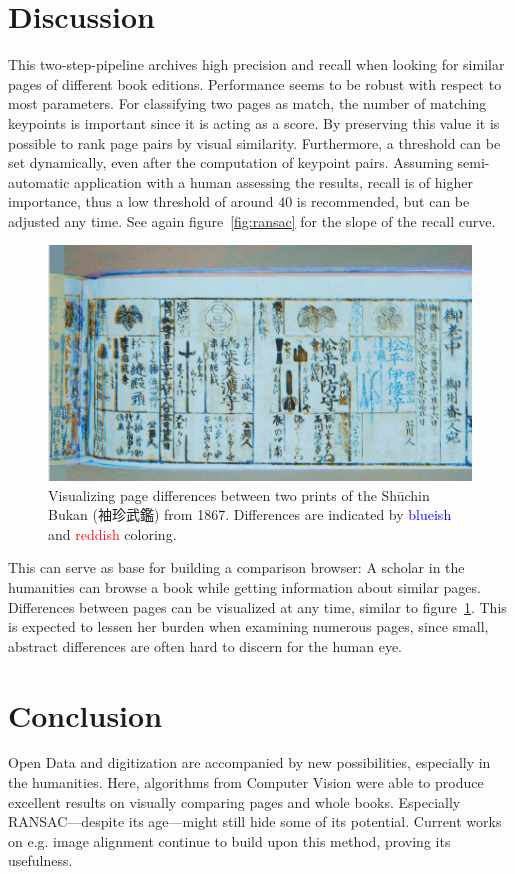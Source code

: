 \documentclass{ltjarticle}
\begin{document}
\section{Discussion}

This two-step-pipeline archives high precision and recall when looking for similar pages of different book editions. Performance seems to be robust with respect to most parameters. For classifying two pages as match, the number of matching keypoints is important since it is acting as a score. By preserving this value it is possible to rank page pairs by visual similarity. Furthermore, a threshold can be set dynamically, even after the computation of keypoint pairs. Assuming semi-automatic application with a human assessing the results, recall is of higher importance, thus a low threshold of around $40$ is recommended, but can be adjusted any time. See again figure~\ref{fig:ransac} for the slope of the recall curve.

\begin{figure}
    \centering
    \includegraphics[width=\textwidth]{200019646_00006}
    \caption[Visualizing page differences]{Visualizing page differences between two prints of the Shūchin Bukan (袖珍武鑑) from 1867. Differences are indicated by \textcolor{blue}{blueish} and \textcolor{red}{reddish} coloring.}
    \label{fig:page-compare}
\end{figure}

This can serve as base for building a comparison browser: A scholar in the humanities can browse a book while getting information about similar pages. Differences between pages can be visualized at any time, similar to figure~\ref{fig:page-compare}. This is expected to lessen her burden when examining numerous pages, since small, abstract differences are often hard to discern for the human eye.

\section{Conclusion}

Open Data and digitization are accompanied by new possibilities, especially in the humanities. Here, algorithms from Computer Vision were able to produce excellent results on visually comparing pages and whole books. Especially RANSAC---despite its age---might still hide some of its potential. Current works on e.g. image alignment \cite{shen2019ransac} continue to build upon this method, proving its usefulness.

\printbibliography
\end{document}
